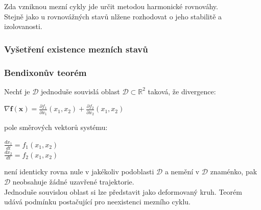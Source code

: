 Zda vzniknou mezní cykly jde určit metodou harmonické rovnováhy.\\
Stejně jako u rovnovážných stavů nlžene rozhodovat o jeho stabilitě a izolovanosti.\\
\subsubsection{Vyšetření existence mezních stavů}
\subsubsection*{Bendixonův teorém}
Nechť je \(\mathcal{D}\) jednoduše souvislá oblast \(\mathcal{D} \subset \mathbb{R}^2 \) taková, že divergence:
\begin{center}
    \(\nabla \mathbf{f}(\mathbf{x}) = \frac{\partial f_1}{\partial x_1}(x_1,x_2) + \frac{\partial f_2}{\partial x_2}(x_1,x_2)\)
\end{center}
pole směrových vektorů systému:
\begin{center}
    \(\frac{dx_1}{dt} = f_1(x_1,x_2)\)\\
    \(\frac{dx_2}{dt} = f_2(x_1,x_2)\)
\end{center}
není identicky rovna nule v jakékoliv podoblasti \(\mathcal{D}\) a nemění v \(\mathcal{D}\) znaménko, pak \(\mathcal{D}\) neobsahuje žádné uzavřené trajektorie.\\
Jednoduše souvislou oblast si lze představit jako deformovaný kruh. Teorém udává podmínku postačující pro neexistenci mezního cyklu.\\
